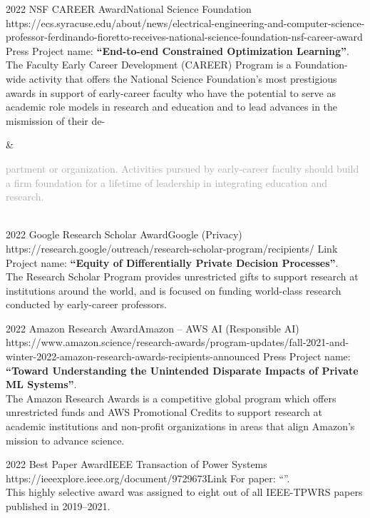 \documentclass[localFont,alternative]{documentMETADATA}
\begin{document}
\begin{awards}
	\awardentryD
	{2022}
	{NSF CAREER Award}{National Science Foundation}
	{https://ecs.syracuse.edu/about/news/electrical-engineering-and-computer-science-professor-ferdinando-fioretto-receives-national-science-foundation-nsf-career-award}
	{Press}
	{Project name: \textbf{``End-to-end Constrained Optimization Learning''}.\\ 
	The Faculty Early Career Development (CAREER) Program is a Foundation-wide activity that offers the National 
	Science Foundation's most prestigious awards in support of early-career faculty who have the potential to 
	serve as academic role models in research and education and to lead advances in the mismission of their de-
	}

	& \begin{minipage}[t]{15.6cm}
	\textcolor{darkGrey}{partment or organization. Activities pursued by early-career faculty should build a firm foundation for a lifetime of leadership in integrating education and research.}\vspace{0.4em}
	\end{minipage}\\
	

	\awardentryD
	{2022}
	{Google Research Scholar Award}{Google (Privacy)}
	{https://research.google/outreach/research-scholar-program/recipients/}
	{Link}
	{
	Project name: \textbf{``Equity of Differentially Private Decision Processes''}.\\
	The Research Scholar Program provides unrestricted gifts to support research at institutions around the world, and is focused on funding world-class research conducted by early-career professors.
	}

	\awardentryD
	{2022}
	{Amazon Research Award}{Amazon -- AWS AI (Responsible AI)}
	{https://www.amazon.science/research-awards/program-updates/fall-2021-and-winter-2022-amazon-research-awards-recipients-announced}
	{Press}
	{
	Project name: \textbf{``Toward Understanding the Unintended Disparate Impacts of Private ML Systems''}.\\
	The Amazon Research Awards is a competitive global program which offers unrestricted funds and AWS Promotional Credits to support research at academic institutions and non-profit organizations in areas that align Amazon's mission to advance science.}

	\awardentryD
	{2022}
	{Best Paper Award}{IEEE Transaction of Power Systems}
	{https://ieeexplore.ieee.org/document/9729673}{Link}
	{
	For paper: ``''.\\
	This highly selective award was assigned to eight out of all IEEE-TPWRS papers published in 2019--2021.}


\end{awards}
\end{document}
